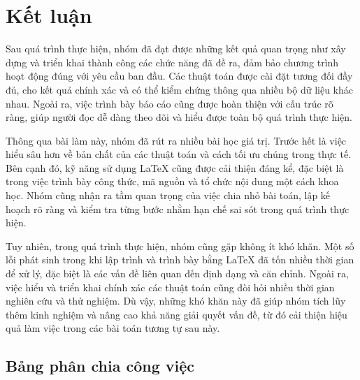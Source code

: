 \documentclass[a4paper,12pt]{report}
\begin{document}
\chapter*{Kết luận}
Sau quá trình thực hiện, nhóm đã đạt được những kết quả quan trọng như xây dựng và triển khai thành công các chức năng đã đề ra, đảm bảo chương trình hoạt động đúng với yêu cầu ban đầu. Các thuật toán được cài đặt tương đối đầy đủ, cho kết quả chính xác và có thể kiểm chứng thông qua nhiều bộ dữ liệu khác nhau. Ngoài ra, việc trình bày báo cáo cũng được hoàn thiện với cấu trúc rõ ràng, giúp người đọc dễ dàng theo dõi và hiểu được toàn bộ quá trình thực hiện.

\medskip

Thông qua bài làm này, nhóm đã rút ra nhiều bài học giá trị. Trước hết là việc hiểu sâu hơn về bản chất của các thuật toán và cách tối ưu chúng trong thực tế. Bên cạnh đó, kỹ năng sử dụng \LaTeX{} cũng được cải thiện đáng kể, đặc biệt là trong việc trình bày công thức, mã nguồn và tổ chức nội dung một cách khoa học. Nhóm cũng nhận ra tầm quan trọng của việc chia nhỏ bài toán, lập kế hoạch rõ ràng và kiểm tra từng bước nhằm hạn chế sai sót trong quá trình thực hiện.

\medskip

Tuy nhiên, trong quá trình thực hiện, nhóm cũng gặp không ít khó khăn. Một số lỗi phát sinh trong khi lập trình và trình bày bằng \LaTeX{} đã tốn nhiều thời gian để xử lý, đặc biệt là các vấn đề liên quan đến định dạng và căn chỉnh. Ngoài ra, việc hiểu và triển khai chính xác các thuật toán cũng đòi hỏi nhiều thời gian nghiên cứu và thử nghiệm. Dù vậy, những khó khăn này đã giúp nhóm tích lũy thêm kinh nghiệm và nâng cao khả năng giải quyết vấn đề, từ đó cải thiện hiệu quả làm việc trong các bài toán tương tự sau này.

\vspace*{0.5cm}
\section*{Bảng phân chia công việc}
\end{document}
